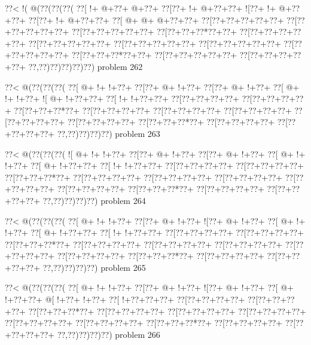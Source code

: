 \vbox{\vbox{\goo
\0??<\- !(\- @(\0??(\0??(\0??(
\0??[\- !+\- @+\0??+\- @+\0??+
\0??[\0??+\- !+\- @+\0??+\0??+
\- ![\0??+\- !+\- @+\0??+\0??+
\0??[\0??+\- !+\- @+\0??+\0??+
\0??[\- @+\- @+\- @+\0??+\0??+
\0??[\0??+\0??+\0??+\0??+\0??+
\0??[\0??+\0??+\0??+\0??+\0??+
\0??[\0??+\0??+\0??+\0??+\0??+
\0??[\0??+\0??+\0??*\0??+\0??+
\0??[\0??+\0??+\0??+\0??+\0??+
\0??[\0??+\0??+\0??+\0??+\0??+
\0??[\0??+\0??+\0??+\0??+\0??+
\0??[\0??+\0??+\0??+\0??+\0??+
\0??[\0??+\0??+\0??+\0??+\0??+
\0??[\0??+\0??+\0??*\0??+\0??+
\0??[\0??+\0??+\0??+\0??+\0??+
\0??[\0??+\0??+\0??+\0??+\0??+
\0??,\0??)\0??)\0??)\0??)\0??)
}
\hfil problem 262\hfil\break
}

\vbox{\vbox{\goo
\0??<\- @(\0??(\0??(\0??(
\0??[\- @+\- !+\- !+\0??+
\0??[\0??+\- @+\- !+\0??+
\0??[\0??+\- @+\- !+\0??+
\0??[\- @+\- !+\- !+\0??+
\- ![\- @+\- !+\0??+\0??+
\0??[\- !+\- !+\0??+\0??+
\0??[\0??+\0??+\0??+\0??+
\0??[\0??+\0??+\0??+\0??+
\0??[\0??+\0??+\0??*\0??+
\0??[\0??+\0??+\0??+\0??+
\0??[\0??+\0??+\0??+\0??+
\0??[\0??+\0??+\0??+\0??+
\0??[\0??+\0??+\0??+\0??+
\0??[\0??+\0??+\0??+\0??+
\0??[\0??+\0??+\0??*\0??+
\0??[\0??+\0??+\0??+\0??+
\0??[\0??+\0??+\0??+\0??+
\0??,\0??)\0??)\0??)\0??)
}
\hfil problem 263\hfil\break
}

\vbox{\vbox{\goo
\0??<\- @(\0??(\0??(\0??(
\- ![\- @+\- !+\- !+\0??+
\0??[\0??+\- @+\- !+\0??+
\0??[\0??+\- @+\- !+\0??+
\0??[\- @+\- !+\- !+\0??+
\0??[\- @+\- !+\0??+\0??+
\0??[\- !+\- !+\0??+\0??+
\0??[\0??+\0??+\0??+\0??+
\0??[\0??+\0??+\0??+\0??+
\0??[\0??+\0??+\0??*\0??+
\0??[\0??+\0??+\0??+\0??+
\0??[\0??+\0??+\0??+\0??+
\0??[\0??+\0??+\0??+\0??+
\0??[\0??+\0??+\0??+\0??+
\0??[\0??+\0??+\0??+\0??+
\0??[\0??+\0??+\0??*\0??+
\0??[\0??+\0??+\0??+\0??+
\0??[\0??+\0??+\0??+\0??+
\0??,\0??)\0??)\0??)\0??)
}
\hfil problem 264\hfil\break
}

\vbox{\vbox{\goo
\0??<\- @(\0??(\0??(\0??(
\0??[\- @+\- !+\- !+\0??+
\0??[\0??+\- @+\- !+\0??+
\- ![\0??+\- @+\- !+\0??+
\0??[\- @+\- !+\- !+\0??+
\0??[\- @+\- !+\0??+\0??+
\0??[\- !+\- !+\0??+\0??+
\0??[\0??+\0??+\0??+\0??+
\0??[\0??+\0??+\0??+\0??+
\0??[\0??+\0??+\0??*\0??+
\0??[\0??+\0??+\0??+\0??+
\0??[\0??+\0??+\0??+\0??+
\0??[\0??+\0??+\0??+\0??+
\0??[\0??+\0??+\0??+\0??+
\0??[\0??+\0??+\0??+\0??+
\0??[\0??+\0??+\0??*\0??+
\0??[\0??+\0??+\0??+\0??+
\0??[\0??+\0??+\0??+\0??+
\0??,\0??)\0??)\0??)\0??)
}
\hfil problem 265\hfil\break
}

\vbox{\vbox{\goo
\0??<\- @(\0??(\0??(\0??(
\0??[\- @+\- !+\- !+\0??+
\0??[\0??+\- @+\- !+\0??+
\- ![\0??+\- @+\- !+\0??+
\0??[\- @+\- !+\0??+\0??+
\- @[\- !+\0??+\- !+\0??+
\0??[\- !+\0??+\0??+\0??+
\0??[\0??+\0??+\0??+\0??+
\0??[\0??+\0??+\0??+\0??+
\0??[\0??+\0??+\0??*\0??+
\0??[\0??+\0??+\0??+\0??+
\0??[\0??+\0??+\0??+\0??+
\0??[\0??+\0??+\0??+\0??+
\0??[\0??+\0??+\0??+\0??+
\0??[\0??+\0??+\0??+\0??+
\0??[\0??+\0??+\0??*\0??+
\0??[\0??+\0??+\0??+\0??+
\0??[\0??+\0??+\0??+\0??+
\0??,\0??)\0??)\0??)\0??)
}
\hfil problem 266\hfil\break
}

